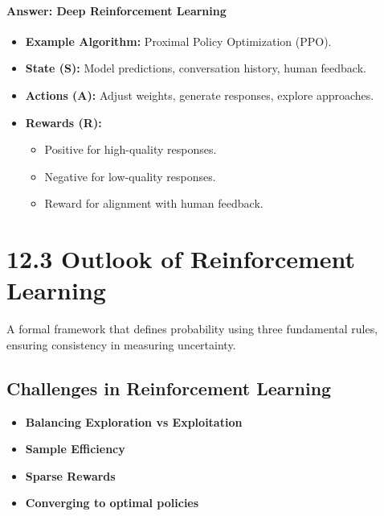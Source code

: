 \documentclass[
  letterpaper,
  DIV=11,
  numbers=noendperiod]{scrreprt}
\providecommand{\tightlist}{%
  \setlength{\itemsep}{0pt}\setlength{\parskip}{0pt}}\usepackage{longtable,booktabs,array}
\begin{document}
\subsubsection{Answer: Deep Reinforcement
Learning}\label{answer-deep-reinforcement-learning}

\begin{itemize}
\tightlist
\item
  \textbf{Example Algorithm:} Proximal Policy Optimization (PPO).
\item
  \textbf{State (S):} Model predictions, conversation history, human
  feedback.
\item
  \textbf{Actions (A):} Adjust weights, generate responses, explore
  approaches.
\item
  \textbf{Rewards (R):}

  \begin{itemize}
  \tightlist
  \item
    Positive for high-quality responses.
  \item
    Negative for low-quality responses.
  \item
    Reward for alignment with human feedback.
  \end{itemize}
\end{itemize}

\chapter{12.3 Outlook of Reinforcement
Learning}\label{outlook-of-reinforcement-learning}

\begin{tcolorbox}[enhanced jigsaw, colback=white, left=2mm, breakable, opacityback=0, bottomrule=.15mm, rightrule=.15mm, arc=.35mm, colframe=quarto-callout-note-color-frame, leftrule=.75mm, toprule=.15mm]

A formal framework that defines probability using three fundamental
rules, ensuring consistency in measuring uncertainty. 🎲

\end{tcolorbox}

\section{Challenges in Reinforcement
Learning}\label{challenges-in-reinforcement-learning}

\begin{itemize}
\item
  \textbf{Balancing Exploration vs Exploitation}
\item
  \textbf{Sample Efficiency}
\item
  \textbf{Sparse Rewards}
\item
  \textbf{Converging to optimal policies}
\end{itemize}
\end{document}
